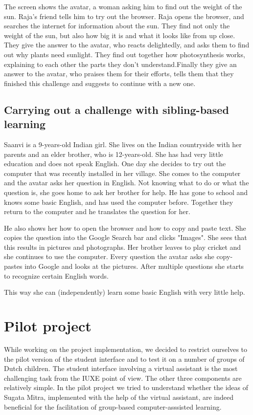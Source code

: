 \documentclass[a4paper]{article}
\begin{document}
The screen shows the avatar, a woman asking him to find out the weight of the sun. Raja's friend tells him to try out the browser. Raja opens the browser, and searches the internet for information about the sun. They find not only the weight of the sun, but also how big it is and what it looks like from up close. They give the answer to the avatar, who reacts delightedly, and asks them to find out why plants need sunlight. They find out together how photosynthesis works, explaining to each other the parts they don't understand.Finally they give an answer to the avatar, who praises them for their efforts, tells them that they finished this challenge and suggests to continue with a new one. 

\subsection{Carrying out a challenge with sibling-based learning} 

Saanvi is a 9-years-old Indian girl. She lives on the Indian countryside with her parents and an elder brother, who is 12-years-old. She has had very little education and does not speak English. One day she decides to try out the computer that was recently installed in her village. She comes to the computer and the avatar asks her question in English. Not knowing what to do or what the question is, she goes home to ask her brother for help. He has gone to school and knows some basic English, and has used the computer before. Together they return to the computer and he translates the question for her. 

He also shows her how to open the browser and how to copy and paste text. She copies the question into the Google Search bar and clicks "Images". She sees that this results in pictures and photographs. Her brother leaves to play cricket and she continues to use the computer. Every question the avatar asks she copy-pastes into Google and looks at the pictures. After multiple questions she starts to recognize certain English words.

This way she can (independently) learn some basic English with very little help. 

\section{Pilot project}

While working on the project implementation, we decided to restrict ourselves to the pilot version of the student interface and to test it on a number of groups of Dutch children. The student interface involving a virtual assistant is the most challenging task from the IUXE point of view. The other three components are relatively simple. In the pilot project we tried to understand whether the ideas of Sugata Mitra, implemented with the help of the virtual assistant, are indeed beneficial for the facilitation of group-based computer-asssisted learning.
\end{document}
